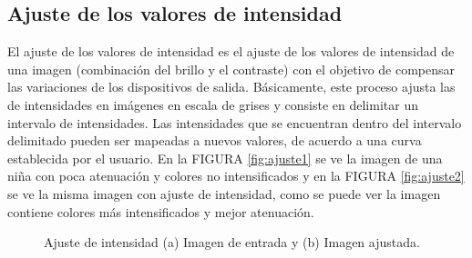 \subsection{Ajuste de los valores de intensidad}

El ajuste de los valores de intensidad es el ajuste  de los valores de intensidad de una imagen (combinación del brillo y el contraste) con el objetivo de compensar las variaciones de los dispositivos de salida. Básicamente, este proceso ajusta las de intensidades en imágenes en escala de grises y consiste en delimitar un intervalo de intensidades. Las intensidades que se encuentran dentro del intervalo delimitado pueden ser mapeadas a nuevos valores, de acuerdo a 
una curva establecida por el usuario.
 En la FIGURA \ref{fig:ajuste1} se ve la imagen de una niña con poca atenuación y colores no intensificados y en la FIGURA \ref{fig:ajuste2} se ve la misma imagen con ajuste de intensidad, %
  como se puede ver la imagen contiene colores más intensificados y mejor atenuación.%
 \begin{figure}[H]
	\centering
	\caption{Ajuste de intensidad (a) Imagen de entrada y (b) Imagen ajustada.}
	\label{fig:ajuste}
\end{figure}



